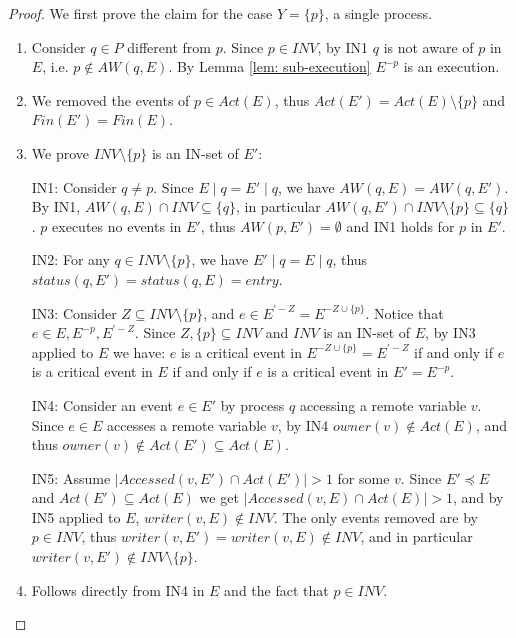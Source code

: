 \begin{proof}
	
	We first prove the claim for the case $Y = \{p\}$, a single process.
\begin{enumerate}
	
\item
	Consider $q \in P$ different from $p$. Since $p \in INV$, by IN1 $q$ is not aware of $p$ in $E$, i.e. $p \notin AW(q,E)$. By Lemma \ref{lem: sub-execution} $E^{-p}$ is an execution.
	
\item
	We removed the events of $p \in Act(E)$, thus $Act(E') = Act(E) \setminus \{p\}$ and $Fin(E') = Fin(E)$.
	
\item
	We prove $INV \setminus \{p\}$ is an IN-set of $E'$:
	
	IN1: Consider $q \neq p$. Since $E \mid q = E' \mid q$, we have $AW(q,E) = AW(q,E')$. By IN1, $AW(q,E) \cap INV \subseteq \{q\}$, in particular $AW(q,E') \cap INV \setminus \{p\} \subseteq \{q\}$. $p$ executes no events in $E'$, thus $AW(p,E') = \emptyset$ and IN1 holds for $p$ in $E'$.
	
	IN2: For any $q \in INV \setminus \{p\}$, we have $E' \mid q = E \mid q$, thus $status(q,E') = status(q,E) = entry$.
	
	IN3: Consider $Z \subseteq INV \setminus \{p\}$, and $e \in E^{'-Z} = E^{-Z \cup \{p\}}$. Notice that $e \in E, E^{-p}, E^{'-Z}$.  Since $Z, \{p\} \subseteq INV$ and $INV$ is an IN-set of $E$, by IN3 applied to $E$ we have: $e$ is a critical event in $E^{-Z \cup \{p\}} = E^{'-Z}$ if and only if $e$ is a critical event in $E$ if and only if $e$ is a critical event in $E' = E^{-p}$.
	
	IN4: Consider an event $e \in E'$ by process $q$ accessing a remote variable $v$. Since $e \in E$ accesses a remote variable $v$, by IN4 $owner(v) \notin Act(E)$, and thus $owner(v) \notin Act(E') \subseteq Act(E)$.
	
	IN5: Assume $|Accessed(v,E') \cap Act(E')| > 1$ for some $v$. Since $E' \preceq E$ and $Act(E') \subseteq Act(E)$ we get $|Accessed(v,E) \cap Act(E)| > 1$, and by IN5 applied to $E$, $writer(v,E) \notin INV$. The only events removed are by $p \in INV$, thus $writer(v,E') = writer(v,E) \notin INV$, and in particular $writer(v,E') \notin INV \setminus \{p\}$.
	
\item
	Follows directly from IN4 in $E$ and the fact that $p \in INV$.
	

\end{enumerate}
\end{proof}
